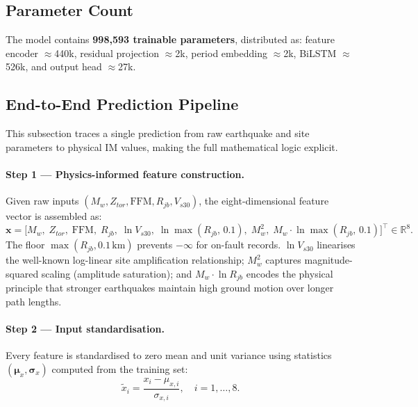 \documentclass[12pt,a4paper]{article}
\begin{document}
\subsection{Parameter Count}

The model contains \textbf{998{,}593 trainable parameters}, distributed as:
feature encoder $\approx$440k, residual projection $\approx$2k, period
embedding $\approx$2k, BiLSTM $\approx$526k, and output head $\approx$27k.

\subsection{End-to-End Prediction Pipeline}
\label{sec:pipeline}

This subsection traces a single prediction from raw earthquake and site
parameters to physical IM values, making the full mathematical logic
explicit.

\paragraph{Step 1 — Physics-informed feature construction.}
Given raw inputs $(M_w, Z_{tor}, \text{FFM}, R_{jb}, V_{s30})$, the
eight-dimensional feature vector is assembled as:
\begin{equation}
  \mathbf{x} = \bigl[
    M_w,\;
    Z_{tor},\;
    \text{FFM},\;
    R_{jb},\;
    \ln V_{s30},\;
    \ln\!\max(R_{jb},\,0.1),\;
    M_w^2,\;
    M_w\cdot\ln\!\max(R_{jb},\,0.1)
  \bigr]^{\!\top} \in \mathbb{R}^8.
  \label{eq:features}
\end{equation}
The floor $\max(R_{jb}, 0.1\,\text{km})$ prevents $-\infty$ for on-fault
records.
$\ln V_{s30}$ linearises the well-known log-linear site amplification
relationship; $M_w^2$ captures magnitude-squared scaling (amplitude
saturation); and $M_w\cdot\ln R_{jb}$ encodes the physical principle that
stronger earthquakes maintain high ground motion over longer path lengths.

\paragraph{Step 2 — Input standardisation.}
Every feature is standardised to zero mean and unit variance using statistics
$(\boldsymbol{\mu}_x, \boldsymbol{\sigma}_x)$ computed from the training set:
\begin{equation}
  \tilde{x}_i = \frac{x_i - \mu_{x,i}}{\sigma_{x,i}}, \quad i = 1,\ldots,8.
  \label{eq:standardise_x}
\end{equation}
\end{document}
